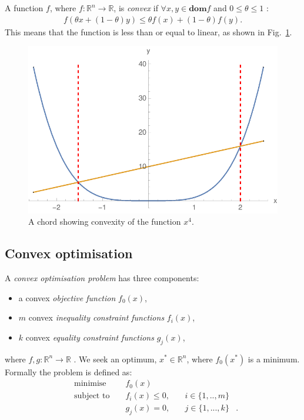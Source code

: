\documentclass[twocolumn,secnumarabic,amssymb, nobibnotes, aps, prl,superscriptaddress]{revtex4-1}
\begin{document}
A function $f$, where $f:\mathbb{R}^n \rightarrow \mathbb{R}$, is \textit{convex} if $\forall x,y\in \textbf{dom} f$ and $0 \leq \theta \leq 1$ \cite[p.67]{cvxpybook}:
\begin{align}
f(\theta x + (1-\theta)y) \leq \theta f(x)+(1-\theta)f(y).
\end{align}
This means that the function is less than or equal to linear, as shown in Fig.~\ref{fig:convex}. %
\begin{figure}[h!]
\includegraphics[width=0.9\linewidth]{convex_function.pdf}
\caption{\label{fig:convex}A chord showing convexity of the function $x^4$.} 
\end{figure}

\subsection{Convex optimisation}
A \textit{convex optimisation problem} has three components:
\begin{itemize}
\item a convex \textit{objective function} $f_0(x)$,
\item $m$ convex \textit{inequality constraint functions} $f_i(x)$,
\item $k$ convex \textit{equality constraint functions} $g_j(x)$, 
\end{itemize}
where $f,g: \mathbb{R}^n \rightarrow \mathbb{R}$ \cite[p.141]{cvxpybook}. We seek an optimum, $x^*\in \mathbb{R}^n$, where $f_0(x^*)$ is a minimum. Formally the problem is defined as:
\begin{align} \label{eq:cvxdefn}
&\text{minimise } && f_0(x) & \nonumber &\\
&\text{subject to } && f_i(x) \leq 0,\quad & i\in \{1,..,m\}\nonumber &\\
& && g_{j}(x)=0,\quad & j\in \{1,...,k\} &.
\end{align}
\end{document}
